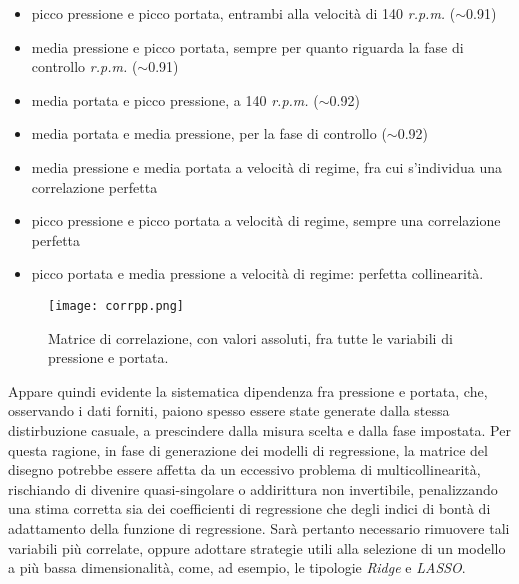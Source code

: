 \documentclass[fleqn,10pt]{SelfArx} %
\begin{document}
\begin{itemize}
    \item picco pressione e picco portata, entrambi alla velocità di 140 \textit{r.p.m.} ($\sim$0.91)
    \item media pressione e picco portata, sempre per quanto riguarda la fase di controllo \textit{r.p.m.} ($\sim$0.91)
    \item media portata e picco pressione, a 140 \textit{r.p.m.} ($\sim$0.92)
    \item media portata e media pressione, per la fase di controllo ($\sim$0.92)
    \item media pressione e media portata a velocità di regime, fra cui s'individua una correlazione perfetta
    \item picco pressione e picco portata a velocità di regime, sempre una correlazione perfetta
    \item picco portata e media pressione a velocità di regime: perfetta collinearità.
\end{itemize}
\begin{figure}[H]
    \centering
    \texttt{[image: corrpp.png]}
    \label{fig:em}
    \caption{Matrice di correlazione, con valori assoluti, fra tutte le variabili di pressione e portata.}
\end{figure}
Appare quindi evidente la sistematica dipendenza fra pressione e portata, che, osservando i dati forniti, paiono spesso essere state generate dalla stessa distirbuzione casuale, a prescindere dalla misura scelta e dalla fase impostata. Per questa ragione, in fase di generazione dei modelli di regressione, la matrice del disegno potrebbe essere affetta da un eccessivo problema di multicollinearità, rischiando di divenire quasi-singolare o addirittura non invertibile, penalizzando una stima corretta sia dei coefficienti di regressione che degli indici di bontà di adattamento della funzione di regressione. Sarà pertanto necessario rimuovere tali variabili più correlate, oppure adottare strategie utili alla selezione di un modello a più bassa dimensionalità, come, ad esempio, le tipologie \textit{Ridge} e \textit{LASSO}.
\end{document}
